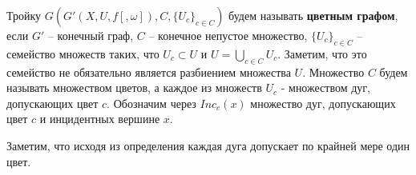 \begin{defn}
	Тройку $G( G'(X, U, f [, \omega]), C, \{U_c\}_{c \in C} )$ будем называть \textbf{цветным графом}, если $G'$ -- конечный граф, $C$ -- конечное непустое множество, $\{U_c\}_{c \in C}$ -- семейство множеств таких, что $U_c \subset U$ и $U = \bigcup\limits_{c \in C} U_c$. Заметим, что это семейство не обязательно является разбиением множества $U$. Множество $C$ будем называть множеством цветов, а каждое из множеств $U_c$ - множеством дуг, допускающих цвет $c$. Обозначим через $Inc_c(x)$ множество дуг, допускающих цвет $c$ и инцидентных вершине $x$.
\end{defn}

Заметим, что исходя из определения каждая дуга допускает по крайней мере один цвет.